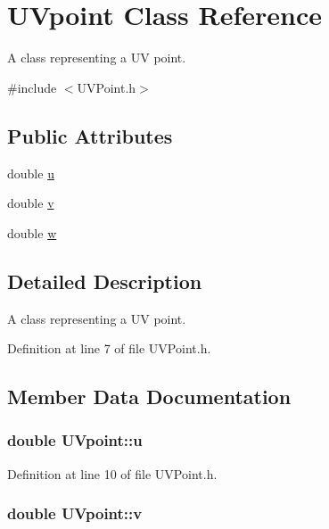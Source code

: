 \hypertarget{classUVpoint}{
\section{UVpoint Class Reference}
\label{classUVpoint}
}


A class representing a UV point.  




{\ttfamily \#include $<$UVPoint.h$>$}

\subsection*{Public Attributes}
\begin{DoxyCompactItemize}
\item 
double \hyperlink{classUVpoint_af1a8f70386bb056c7a06fd87ee0b71e1}{u}
\item 
double \hyperlink{classUVpoint_a21dfe5f1d80378fd82208c28c5c26c11}{v}
\item 
double \hyperlink{classUVpoint_a63806cfcf5064f6b87618d4fcd389f01}{w}
\end{DoxyCompactItemize}


\subsection{Detailed Description}
A class representing a UV point. 

Definition at line 7 of file UVPoint.h.



\subsection{Member Data Documentation}
\hypertarget{classUVpoint_af1a8f70386bb056c7a06fd87ee0b71e1}{
\subsubsection[{u}]{\setlength{\rightskip}{0pt plus 5cm}double {\bf UVpoint::u}}}
\label{classUVpoint_af1a8f70386bb056c7a06fd87ee0b71e1}


Definition at line 10 of file UVPoint.h.

\hypertarget{classUVpoint_a21dfe5f1d80378fd82208c28c5c26c11}{
\subsubsection[{v}]{\setlength{\rightskip}{0pt plus 5cm}double {\bf UVpoint::v}}}
\label{classUVpoint_a21dfe5f1d80378fd82208c28c5c26c11}


